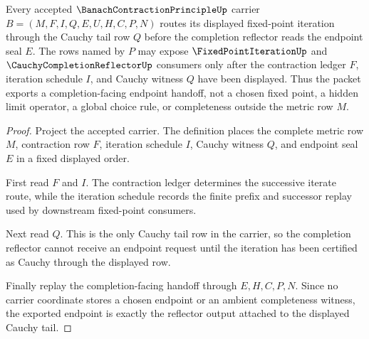 \begin{theorem}
\label{thm:banach-contraction-principle-iteration-cauchy-handoff}
Every accepted $\BanachContractionPrincipleUp$ carrier $B=(M,F,I,Q,E,U,H,C,P,N)$ routes its displayed fixed-point iteration through the Cauchy tail row $Q$ before the completion reflector reads the endpoint seal $E$. The rows named by $P$ may expose $\FixedPointIterationUp$ and $\CauchyCompletionReflectorUp$ consumers only after the contraction ledger $F$, iteration schedule $I$, and Cauchy witness $Q$ have been displayed. Thus the packet exports a completion-facing endpoint handoff, not a chosen fixed point, a hidden limit operator, a global choice rule, or completeness outside the metric row $M$.
\end{theorem}
\begin{proof}
Project the accepted carrier. The definition places the complete metric row $M$, contraction row $F$, iteration schedule $I$, Cauchy witness $Q$, and endpoint seal $E$ in a fixed displayed order.

First read $F$ and $I$. The contraction ledger determines the successive iterate route, while the iteration schedule records the finite prefix and successor replay used by downstream fixed-point consumers.

Next read $Q$. This is the only Cauchy tail row in the carrier, so the completion reflector cannot receive an endpoint request until the iteration has been certified as Cauchy through the displayed row.

Finally replay the completion-facing handoff through $E,H,C,P,N$. Since no carrier coordinate stores a chosen endpoint or an ambient completeness witness, the exported endpoint is exactly the reflector output attached to the displayed Cauchy tail.
\end{proof}


